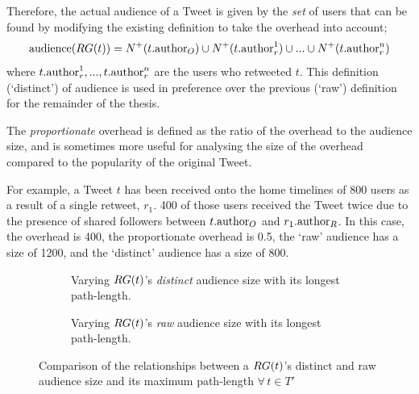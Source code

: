 Therefore, the actual audience of a Tweet is given by the \textit{set} of users that can be found by modifying the existing definition to take the overhead into account;
\[
	\textrm{audience}(RG(t)) = N^+(t.\textrm{author}_O) \cup N^+(t.\textrm{author}_r^1) \cup ... \cup N^+(t.\textrm{author}_r^n)
\]
where $t.\textrm{author}_r^1, ..., t.\textrm{author}_r^n$ are the users who retweeted $t$. This definition (`distinct') of audience is used in preference over the previous (`raw') definition for the remainder of the thesis.

 The \textit{proportionate} overhead is defined as the ratio of the overhead to the audience size, and is sometimes more useful for analysing the size of the overhead compared to the popularity of the original Tweet.

For example, a Tweet $t$ has been received onto the home timelines of 800 users as a result of a single retweet, $r_1$. 400 of those users received the Tweet twice due to the presence of shared followers between $t.\textrm{author}_O$ and $r_1.\textrm{author}_R$. In this case, the overhead is 400, the proportionate overhead is 0.5, the `raw'  audience has a size of 1200, and the `distinct' audience has a size of 800.

\begin{figure}[h]
\begin{subfigure}{.5\textwidth}
    \centering
    \caption{Varying $RG(t)$'s \textit{distinct} audience size with its longest path-length.}
    \label{fig:pathlength-audience}
\end{subfigure}
\quad
\begin{subfigure}{.5\textwidth}
    \centering
    \caption{Varying $RG(t)$'s \textit{raw} audience size with its longest path-length.}
    \label{fig:pathlength-rawaudience}
\end{subfigure}
\caption{Comparison of the relationships between a $RG(t)$'s distinct and raw audience size and its maximum path-length $\forall \, t \in T'$}
\label{fig:audience_and_pathlength}
\end{figure}

